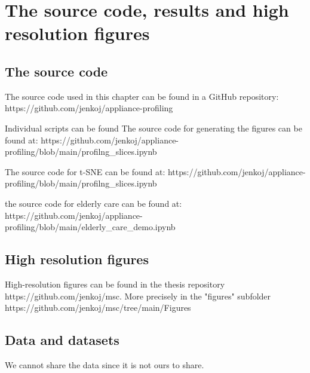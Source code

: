 
\chapter{The source code, results and high resolution figures} %

\label{AppendixA} %

\section{The source code}

The source code used in this chapter can be found in a GitHub repository:
https://github.com/jenkoj/appliance-profiling

Individual scripts can be found 
The source code for generating the figures can be found at:
https://github.com/jenkoj/appliance-profiling/blob/main/profilng_slices.ipynb

The source code for t-SNE can be found at:
https://github.com/jenkoj/appliance-profiling/blob/main/profilng_slices.ipynb

the source code for elderly care can be found at:
https://github.com/jenkoj/appliance-profiling/blob/main/elderly_care_demo.ipynb

\section{High resolution figures}

High-resolution figures can be found in the thesis repository https://github.com/jenkoj/msc.
More precisely in the "figures" subfolder https://github.com/jenkoj/msc/tree/main/Figures

\section{Data and datasets}

We cannot share the data since it is not ours to share.









